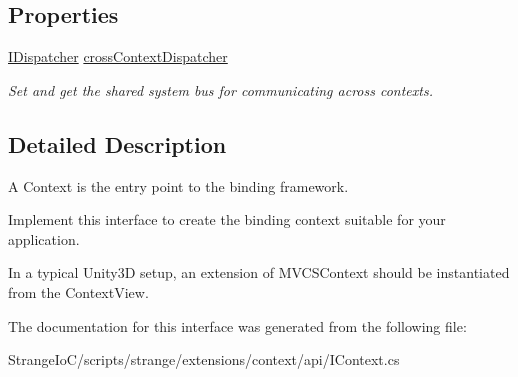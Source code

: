 \subsection*{Properties}
\begin{DoxyCompactItemize}
\item 
\hypertarget{interfacestrange_1_1extensions_1_1context_1_1api_1_1_i_context_ac0e9b15b9639efe7ad58d0b9cfe0445a}{\hyperlink{interfacestrange_1_1extensions_1_1dispatcher_1_1api_1_1_i_dispatcher}{I\-Dispatcher} \hyperlink{interfacestrange_1_1extensions_1_1context_1_1api_1_1_i_context_ac0e9b15b9639efe7ad58d0b9cfe0445a}{cross\-Context\-Dispatcher}}\label{interfacestrange_1_1extensions_1_1context_1_1api_1_1_i_context_ac0e9b15b9639efe7ad58d0b9cfe0445a}

\begin{DoxyCompactList}\small\item\em Set and get the shared system bus for communicating across contexts. \end{DoxyCompactList}\end{DoxyCompactItemize}


\subsection{Detailed Description}
A Context is the entry point to the binding framework. 

Implement this interface to create the binding context suitable for your application.

In a typical Unity3\-D setup, an extension of M\-V\-C\-S\-Context should be instantiated from the Context\-View. 

The documentation for this interface was generated from the following file\-:\begin{DoxyCompactItemize}
\item 
Strange\-Io\-C/scripts/strange/extensions/context/api/I\-Context.\-cs\end{DoxyCompactItemize}
